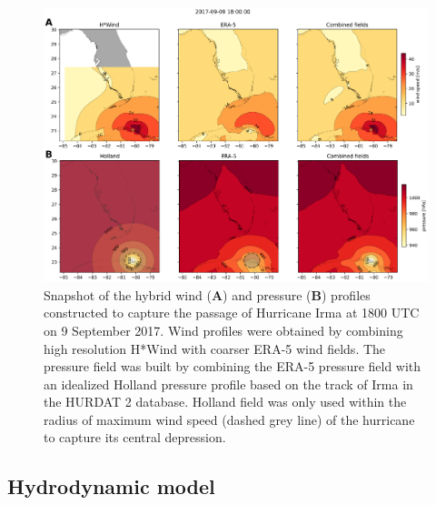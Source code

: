 \begin{figure}
    \centering
    \includegraphics[width=.99\textwidth]{chapters/irma/figures/hwind+holland_vs_era.png}
    \caption{Snapshot of the hybrid wind (\textbf{A}) and pressure (\textbf{B}) profiles constructed to capture the passage of Hurricane Irma at 1800 UTC on 9 September 2017. Wind profiles were obtained by combining high resolution H*Wind with coarser ERA-5 wind fields. The pressure field was built by combining the ERA-5 pressure field with an idealized Holland pressure profile based on the track of Irma in the HURDAT 2 database. Holland field was only used within the radius of maximum wind speed (dashed grey line) of the hurricane to capture its central depression. }
    \label{fig:atm}
\end{figure}

\subsection{Hydrodynamic model}

